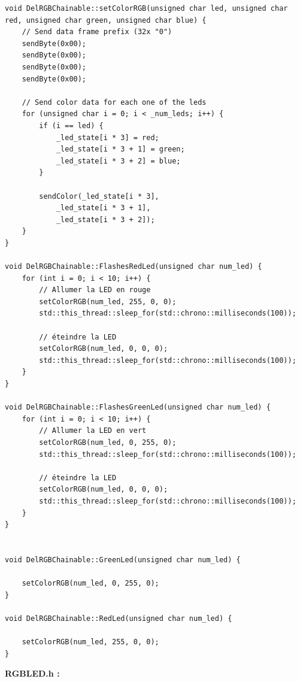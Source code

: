\documentclass[main.tex]{subfiles}
\begin{document}
\begin{lstlisting}
void DelRGBChainable::setColorRGB(unsigned char led, unsigned char red, unsigned char green, unsigned char blue) {
    // Send data frame prefix (32x "0")
    sendByte(0x00);
    sendByte(0x00);
    sendByte(0x00);
    sendByte(0x00);

    // Send color data for each one of the leds
    for (unsigned char i = 0; i < _num_leds; i++) {
        if (i == led) {
            _led_state[i * 3] = red;
            _led_state[i * 3 + 1] = green;
            _led_state[i * 3 + 2] = blue;
        }

        sendColor(_led_state[i * 3],
            _led_state[i * 3 + 1],
            _led_state[i * 3 + 2]);
    }
}

void DelRGBChainable::FlashesRedLed(unsigned char num_led) {
    for (int i = 0; i < 10; i++) {
        // Allumer la LED en rouge
        setColorRGB(num_led, 255, 0, 0);
        std::this_thread::sleep_for(std::chrono::milliseconds(100));

        // éteindre la LED
        setColorRGB(num_led, 0, 0, 0);
        std::this_thread::sleep_for(std::chrono::milliseconds(100));
    }
}

void DelRGBChainable::FlashesGreenLed(unsigned char num_led) {
    for (int i = 0; i < 10; i++) {
        // Allumer la LED en vert
        setColorRGB(num_led, 0, 255, 0);
        std::this_thread::sleep_for(std::chrono::milliseconds(100));

        // éteindre la LED
        setColorRGB(num_led, 0, 0, 0);
        std::this_thread::sleep_for(std::chrono::milliseconds(100));
    }
}


void DelRGBChainable::GreenLed(unsigned char num_led) {

    setColorRGB(num_led, 0, 255, 0);
}

void DelRGBChainable::RedLed(unsigned char num_led) {

    setColorRGB(num_led, 255, 0, 0);
}
\end{lstlisting}

\textbf{RGBLED.h :}
\end{document}
